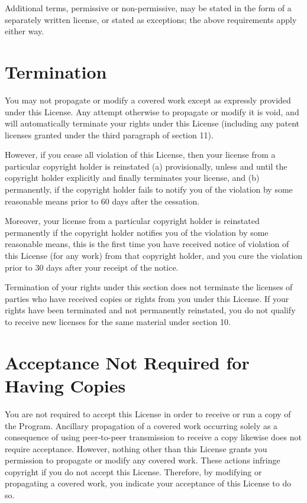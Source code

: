 Additional terms, permissive or non-permissive, may be stated in the form of a separately written license, or stated as exceptions; the above requirements apply either way.
\section{Termination}

You may not propagate or modify a covered work except as expressly provided under this License. Any attempt otherwise to propagate or modify it is void, and will automatically terminate your rights under this License (including any patent licenses granted under the third paragraph of section 11).

However, if you cease all violation of this License, then your license from a particular copyright holder is reinstated (a) provisionally, unless and until the copyright holder explicitly and finally terminates your license, and (b) permanently, if the copyright holder fails to notify you of the violation by some reasonable means prior to 60 days after the cessation.

Moreover, your license from a particular copyright holder is reinstated permanently if the copyright holder notifies you of the violation by some reasonable means, this is the first time you have received notice of violation of this License (for any work) from that copyright holder, and you cure the violation prior to 30 days after your receipt of the notice.

Termination of your rights under this section does not terminate the licenses of parties who have received copies or rights from you under this License. If your rights have been terminated and not permanently reinstated, you do not qualify to receive new licenses for the same material under section 10.
\section{Acceptance Not Required for Having Copies}

You are not required to accept this License in order to receive or run a copy of the Program. Ancillary propagation of a covered work occurring solely as a consequence of using peer-to-peer transmission to receive a copy likewise does not require acceptance. However, nothing other than this License grants you permission to propagate or modify any covered work. These actions infringe copyright if you do not accept this License. Therefore, by modifying or propagating a covered work, you indicate your acceptance of this License to do so.
